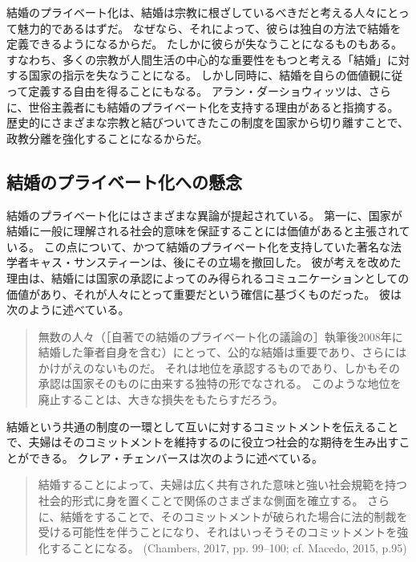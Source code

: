 \documentclass[paper=a4,book,openany]{jlreq}
\newcommand{\ig}[1]{}           %
\begin{document}
結婚のプライベート化は、結婚は宗教に根ざしているべきだと考える人々にとって魅力的であるはずだ。
なぜなら、それによって、彼らは独自の方法で結婚を定義できるようになるからだ。
たしかに彼らが失なうことになるものもある。
すなわち、多くの宗教が人間生活の中心的な重要性をもつと考える「結婚」に対する国家の指示を失なうことになる。
しかし同時に、結婚を自らの価値観に従って定義する自由を得ることにもなる。
アラン・ダーショウィッツは、さらに、世俗主義者にも結婚のプライベート化を支持する理由があると指摘する。
歴史的にさまざまな宗教と結びついてきたこの制度を国家から切り離すことで、政教分離を強化することになるからだ\citep{dershowitz03:_to_fix_gay_dilem_gover}。

\subsection{結婚のプライベート化への懸念}

結婚のプライベート化にはさまざまな異論が提起されている。
第一に、国家が結婚に一般に理解される社会的意味を保証することには価値があると主張されている。
この点について、かつて結婚のプライベート化を支持していた著名な法学者キャス・サンスティーンは、後にその立場を撤回した。
彼が考えを改めた理由は、結婚には国家の承認によってのみ得られるコミュニケーションとしての価値があり、それが人々にとって重要だという確信に基づくものだった。
彼は次のように述べている。

\begin{quote}
無数の人々（［自著での結婚のプライベート化の議論の］執筆後2008年に結婚した筆者自身を含む）にとって、公的な結婚は重要であり、さらにはかけがえのないものだ。
それは地位を承認するものであり、しかもその承認は国家そのものに由来する独特の形でなされる。
このような地位を廃止することは、大きな損失をもたらすだろう。
\citep[p.296]{sunstein17:_statem_i_most_regret}
\end{quote}

結婚という共通の制度の一環として互いに対するコミットメントを伝えることで、夫婦はそのコミットメントを維持するのに役立つ社会的な期待を生み出すことができる。
クレア・チェンバースは次のように述べている。

\begin{quote}
結婚することによって、夫婦は広く共有された意味と強い社会規範を持つ社会的形式に身を置くことで関係のさまざまな側面を確立する。
さらに、結婚をすることで、そのコミットメントが破られた場合に法的制裁を受ける可能性を伴うことになり、それはいっそうそのコミットメントを強化することになる。
(Chambers, 2017, pp. 99--100; cf. Macedo, 2015, p.95) \nocite{chambers17:againstmarriage} \nocite{macedo15:_just_married}\ig{Clare chmbers}
\end{quote}
\end{document}
